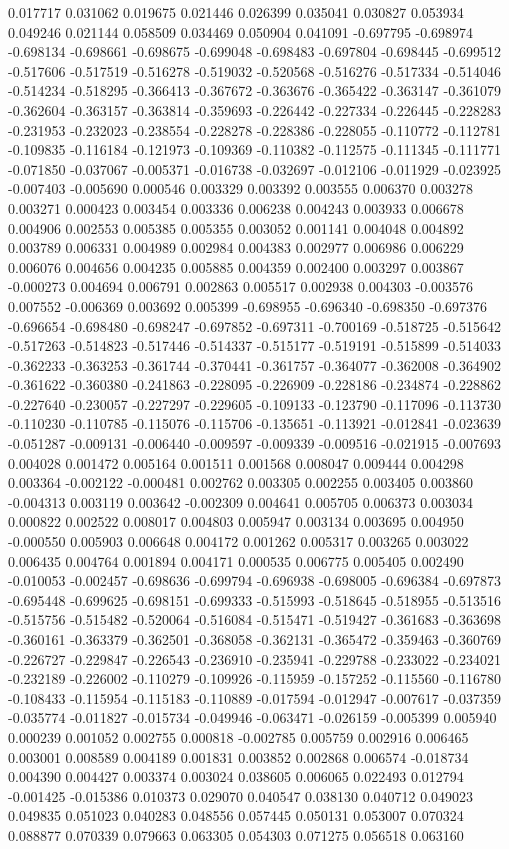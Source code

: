 0.017717
0.031062
0.019675
0.021446
0.026399
0.035041
0.030827
0.053934
0.049246
0.021144
0.058509
0.034469
0.050904
0.041091
-0.697795
-0.698974
-0.698134
-0.698661
-0.698675
-0.699048
-0.698483
-0.697804
-0.698445
-0.699512
-0.517606
-0.517519
-0.516278
-0.519032
-0.520568
-0.516276
-0.517334
-0.514046
-0.514234
-0.518295
-0.366413
-0.367672
-0.363676
-0.365422
-0.363147
-0.361079
-0.362604
-0.363157
-0.363814
-0.359693
-0.226442
-0.227334
-0.226445
-0.228283
-0.231953
-0.232023
-0.238554
-0.228278
-0.228386
-0.228055
-0.110772
-0.112781
-0.109835
-0.116184
-0.121973
-0.109369
-0.110382
-0.112575
-0.111345
-0.111771
-0.071850
-0.037067
-0.005371
-0.016738
-0.032697
-0.012106
-0.011929
-0.023925
-0.007403
-0.005690
0.000546
0.003329
0.003392
0.003555
0.006370
0.003278
0.003271
0.000423
0.003454
0.003336
0.006238
0.004243
0.003933
0.006678
0.004906
0.002553
0.005385
0.005355
0.003052
0.001141
0.004048
0.004892
0.003789
0.006331
0.004989
0.002984
0.004383
0.002977
0.006986
0.006229
0.006076
0.004656
0.004235
0.005885
0.004359
0.002400
0.003297
0.003867
-0.000273
0.004694
0.006791
0.002863
0.005517
0.002938
0.004303
-0.003576
0.007552
-0.006369
0.003692
0.005399
-0.698955
-0.696340
-0.698350
-0.697376
-0.696654
-0.698480
-0.698247
-0.697852
-0.697311
-0.700169
-0.518725
-0.515642
-0.517263
-0.514823
-0.517446
-0.514337
-0.515177
-0.519191
-0.515899
-0.514033
-0.362233
-0.363253
-0.361744
-0.370441
-0.361757
-0.364077
-0.362008
-0.364902
-0.361622
-0.360380
-0.241863
-0.228095
-0.226909
-0.228186
-0.234874
-0.228862
-0.227640
-0.230057
-0.227297
-0.229605
-0.109133
-0.123790
-0.117096
-0.113730
-0.110230
-0.110785
-0.115076
-0.115706
-0.135651
-0.113921
-0.012841
-0.023639
-0.051287
-0.009131
-0.006440
-0.009597
-0.009339
-0.009516
-0.021915
-0.007693
0.004028
0.001472
0.005164
0.001511
0.001568
0.008047
0.009444
0.004298
0.003364
-0.002122
-0.000481
0.002762
0.003305
0.002255
0.003405
0.003860
-0.004313
0.003119
0.003642
-0.002309
0.004641
0.005705
0.006373
0.003034
0.000822
0.002522
0.008017
0.004803
0.005947
0.003134
0.003695
0.004950
-0.000550
0.005903
0.006648
0.004172
0.001262
0.005317
0.003265
0.003022
0.006435
0.004764
0.001894
0.004171
0.000535
0.006775
0.005405
0.002490
-0.010053
-0.002457
-0.698636
-0.699794
-0.696938
-0.698005
-0.696384
-0.697873
-0.695448
-0.699625
-0.698151
-0.699333
-0.515993
-0.518645
-0.518955
-0.513516
-0.515756
-0.515482
-0.520064
-0.516084
-0.515471
-0.519427
-0.361683
-0.363698
-0.360161
-0.363379
-0.362501
-0.368058
-0.362131
-0.365472
-0.359463
-0.360769
-0.226727
-0.229847
-0.226543
-0.236910
-0.235941
-0.229788
-0.233022
-0.234021
-0.232189
-0.226002
-0.110279
-0.109926
-0.115959
-0.157252
-0.115560
-0.116780
-0.108433
-0.115954
-0.115183
-0.110889
-0.017594
-0.012947
-0.007617
-0.037359
-0.035774
-0.011827
-0.015734
-0.049946
-0.063471
-0.026159
-0.005399
0.005940
0.000239
0.001052
0.002755
0.000818
-0.002785
0.005759
0.002916
0.006465
0.003001
0.008589
0.004189
0.001831
0.003852
0.002868
0.006574
-0.018734
0.004390
0.004427
0.003374
0.003024
0.038605
0.006065
0.022493
0.012794
-0.001425
-0.015386
0.010373
0.029070
0.040547
0.038130
0.040712
0.049023
0.049835
0.051023
0.040283
0.048556
0.057445
0.050131
0.053007
0.070324
0.088877
0.070339
0.079663
0.063305
0.054303
0.071275
0.056518
0.063160
